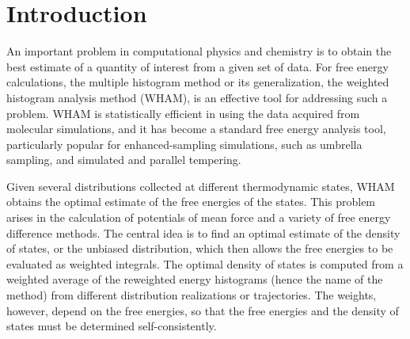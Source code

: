 \documentclass[reprint,aip,jcp,superscriptaddress]{revtex4-1}
\begin{document}
\maketitle




\section{Introduction}





An important problem in computational physics and chemistry
is to obtain the best estimate of a quantity of interest
from a given set of data\cite{
shirts2008}.
%
For free energy calculations,
the multiple histogram method\cite{
ferrenberg1988, *ferrenberg1989,
newman, frenkel}
or its generalization,
the weighted histogram analysis method (WHAM)\cite{
kumar1992, roux1995,
bartels1997, *gallicchio2005, *habeck2007, *habeck2012,
souaille2001,
chodera2007, shirts2008, bereau2009,
hub2010, zhu2012},
is an effective tool for
addressing such a problem.
%
WHAM is statistically efficient in using the data
acquired from molecular simulations,
and it has become
a standard free energy analysis tool,
particularly popular
for enhanced-sampling simulations,
such as umbrella sampling\cite{
torrie1974, *laio2002},
and simulated\cite{
marinari1992, *lyubartsev1992}
and parallel\cite{
swendsen1986, *geyer1991, *hukushima1996, *hansmann1997, *earl2005}
tempering.




Given several distributions collected
at different thermodynamic states,
WHAM obtains the optimal estimate
of the free energies of the states.
%
This problem arises in the calculation of potentials of mean force and a variety of free energy difference methods.
%
The central idea  is to find an optimal estimate
of the density of states,
or the unbiased distribution,
which then allows
the free energies to be evaluated
as weighted integrals.
%
The optimal density of states
is computed from a weighted average
of the reweighted energy histograms
(hence the name of the method)
from different distribution realizations or trajectories.
%
The weights, however,
depend on the free energies,
so that
the free energies
and the density of states
must be determined self-consistently.
\end{document}
